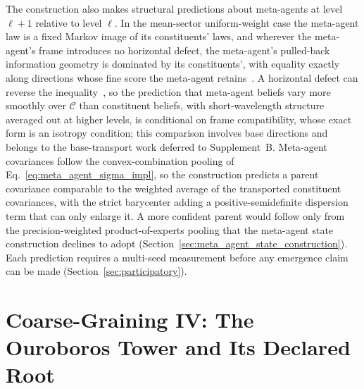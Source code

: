 The construction also makes structural predictions about meta-agents at level $\ell+1$ relative to level $\ell$. In the mean-sector uniform-weight case the meta-agent law is a fixed Markov image of its constituents' laws, and wherever the meta-agent's frame introduces no horizontal defect, the meta-agent's pulled-back information geometry is dominated by its constituents', with equality exactly along directions whose fine score the meta-agent retains~\cite[Ch.~B2, the coarse or meta-agent perceived-geometry corollary]{DennisGaugeVFESuppB2026}. A horizontal defect can reverse the inequality~\cite[Ch.~B2, the exact signed positivity criterion]{DennisGaugeVFESuppB2026}, so the prediction that meta-agent beliefs vary more smoothly over $\mathcal{C}$ than constituent beliefs, with short-wavelength structure averaged out at higher levels, is conditional on frame compatibility, whose exact form is an isotropy condition; this comparison involves base directions and belongs to the base-transport work deferred to Supplement~B. Meta-agent covariances follow the convex-combination pooling of Eq.~\eqref{eq:meta_agent_sigma_impl}, so the construction predicts a parent covariance comparable to the weighted average of the transported constituent covariances, with the strict barycenter adding a positive-semidefinite dispersion term that can only enlarge it. A more confident parent would follow only from the precision-weighted product-of-experts pooling that the meta-agent state construction declines to adopt (Section~\ref{sec:meta_agent_state_construction}). Each prediction requires a multi-seed measurement before any emergence claim can be made (Section~\ref{sec:participatory}).

\section{Coarse-Graining IV: The Ouroboros Tower and Its Declared Root}\label{sec:ouroboros}

